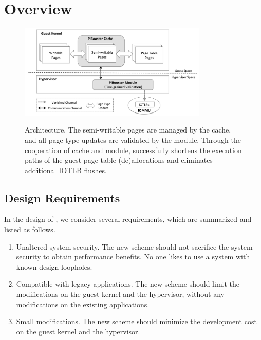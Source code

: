 \section{\name Overview} \label{sec:overview}
\begin{figure}[ht]
\centering
\includegraphics[width=0.8\textwidth]{image/overview/arch.pdf} \\
\caption{\name Architecture. The semi-writable pages are managed by the \name cache, and all page type updates are validated by the \name module.
Through the cooperation of \name cache and \name module, \name successfully shortens the execution paths of the guest page table (de)allocations and eliminates additional IOTLB flushes.}
\label{fig:arch}
\end{figure}

\subsection{Design Requirements}\label{sec:req}
In the design of \name, we consider several requirements, which are summarized and listed as follows.
\begin{enumerate}
\item Unaltered system security. The new scheme should not sacrifice the system security to obtain performance benefits. No one likes to use a system with known design loopholes.
\item Compatible with legacy applications. The new scheme should limit the modifications on the guest kernel and the hypervisor, without any modifications on the existing applications.
\item Small modifications. The new scheme should minimize the development cost on the guest kernel and the hypervisor.
\end{enumerate}

